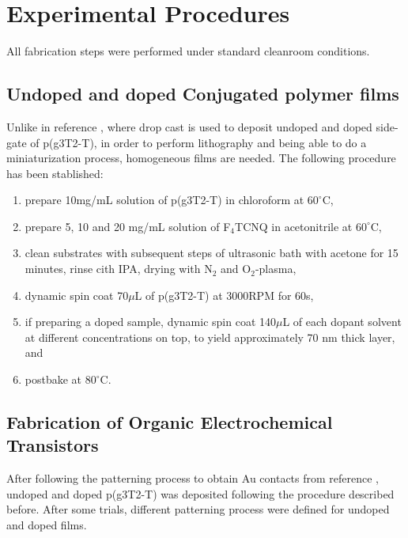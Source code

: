 \section{Experimental Procedures}

All fabrication steps were performed under standard cleanroom conditions.

\subsection{Undoped and doped Conjugated polymer films}
Unlike in reference \cite{tanTuningOrganicElectrochemical2022}, where drop cast is used to deposit undoped and doped side-gate of p(g3T2-T), in order to perform lithography and being able to do a miniaturization process, homogeneous films are needed. The following procedure
has been stablished:

\begin{enumerate}
\item prepare 10mg/mL solution of p(g3T2-T) in chloroform at $60^{\circ}$C,
\item prepare 5, 10 and 20 mg/mL solution of F$_{4}$TCNQ in acetonitrile at $60^{\circ}$C,
\item clean substrates with subsequent steps of ultrasonic bath with acetone for 15 minutes, rinse cith IPA, drying with N$_{2}$ and O$_{2}$-plasma,
\item dynamic spin coat 70$\mu$L of p(g3T2-T) at 3000RPM for 60s,
\item if preparing a doped sample, dynamic spin coat 140$\mu$L of each dopant solvent at different concentrations on top, to yield approximately 70 nm thick layer, and
\item postbake at $80^{\circ}$C.
\end{enumerate}


\subsection{Fabrication of Organic Electrochemical Transistors}
After following the patterning process to obtain Au contacts from reference , undoped and doped
p(g3T2-T) was deposited following the procedure described before. After some trials, different patterning process were defined for undoped and doped films.

